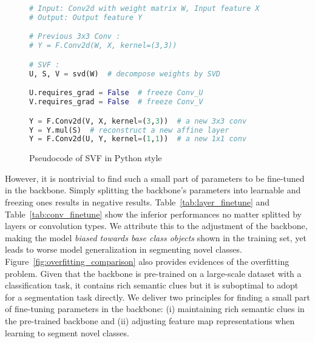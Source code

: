\documentclass{article}
\begin{document}
\begin{wrapfigure}{r}{7.5cm}
\vspace{-0.7cm}
\centering
\begin{minipage}{1.0\linewidth}

  \begin{algorithm}[H]\small
\caption{Pseudocode of SVF in Python style}
\label{alg:SVF}
\begin{lstlisting}[language=python]
# Input: Conv2d with weight matrix W, Input feature X
# Output: Output feature Y

# Previous 3x3 Conv : 
# Y = F.Conv2d(W, X, kernel=(3,3))

# SVF : 
U, S, V = svd(W)  # decompose weights by SVD

U.requires_grad = False  # freeze Conv_U
V.requires_grad = False  # freeze Conv_V

Y = F.Conv2d(V, X, kernel=(3,3))  # a new 3x3 conv
Y = Y.mul(S)  # reconstruct a new affine layer
Y = F.Conv2d(U, Y, kernel=(1,1))  # a new 1x1 conv
\end{lstlisting}
\end{algorithm}
\end{minipage}
\vspace{-0.4cm}
\end{wrapfigure}

However, it is nontrivial to find such a small part of parameters to be fine-tuned in the backbone. Simply splitting the backbone's parameters into learnable and freezing ones results in negative results. Table~\ref{tab:layer_finetune} and Table~\ref{tab:conv_finetune} show the inferior performances no matter splitted by layers or convolution types. We attribute this to the adjustment of the backbone, making the model {\em biased towards base class objects} shown in the training set, yet leads to worse model generalization in segmenting novel classes. Figure~\ref{fig:overfitting_comparison} also provides evidences of the overfitting problem. Given that the backbone is pre-trained on a large-scale dataset with a classification task, it contains rich semantic clues but it is suboptimal to adopt for a segmentation task directly. We deliver two principles for finding a small part of fine-tuning parameters in the backbone: (i) maintaining rich semantic clues in the pre-trained backbone and (ii) adjusting feature map representations when learning to segment novel classes.
\end{document}

